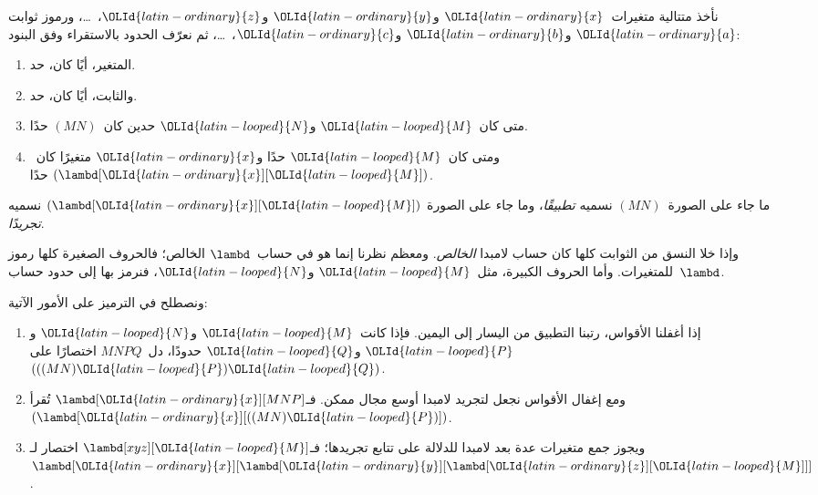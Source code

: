 \documentclass[../../../include/open-logic-section]{subfiles}
\begin{document}

نأخذ متتالية متغيرات~${\OLId{latin-ordinary}{x}}$ و${\OLId{latin-ordinary}{y}}$ و${\OLId{latin-ordinary}{z}}$،~\dots، ورموز ثوابت
${\OLId{latin-ordinary}{a}}$ و${\OLId{latin-ordinary}{b}}$ و${\OLId{latin-ordinary}{c}}$،~\dots، ثم نعرّف الحدود بالاستقراء وفق البنود:
\begin{enumerate}
\item المتغير، أيًا كان، حد.
\item والثابت، أيًا كان، حد.
\item متى كان~${\OLId{latin-looped}{M}}$ و${\OLId{latin-looped}{N}}$ حدين كان~$(MN)$ حدًا.
\item ومتى كان~${\OLId{latin-looped}{M}}$ حدًا و${\OLId{latin-ordinary}{x}}$ متغيرًا كان~$(\lambd[{\OLId{latin-ordinary}{x}}][{\OLId{latin-looped}{M}}])$ حدًا.
\end{enumerate}
ما جاء على الصورة~$(MN)$ نسميه \emph{تطبيقًا}، وما جاء على الصورة
$(\lambd[{\OLId{latin-ordinary}{x}}][{\OLId{latin-looped}{M}}])$ نسميه \emph{تجريدًا}.

وإذا خلا النسق من الثوابت كلها كان حساب لامبدا \emph{الخالص}.
ومعظم نظرنا إنما هو في حساب~$\lambd$ الخالص؛ فالحروف الصغيرة
كلها رموز للمتغيرات. وأما الحروف الكبيرة، مثل~${\OLId{latin-looped}{M}}$ و${\OLId{latin-looped}{N}}$،
فنرمز بها إلى حدود حساب~$\lambd$.

ونصطلح في الترميز على الأمور الآتية:

\begin{conv}
\begin{enumerate}
\item إذا أغفلنا الأقواس، رتبنا التطبيق من اليسار إلى اليمين.
  فإذا كانت~${\OLId{latin-looped}{M}}$ و${\OLId{latin-looped}{N}}$ و${\OLId{latin-looped}{P}}$ و${\OLId{latin-looped}{Q}}$ حدودًا، دل~$MNPQ$ اختصارًا
  على~$(((MN){\OLId{latin-looped}{P}}){\OLId{latin-looped}{Q}})$.
\item ومع إغفال الأقواس نجعل لتجريد لامبدا أوسع مجال ممكن.
  فـ$\lambd[{\OLId{latin-ordinary}{x}}][MNP]$ تُقرأ~$(\lambd[{\OLId{latin-ordinary}{x}}][((MN){\OLId{latin-looped}{P}})])$.
\item ويجوز جمع متغيرات عدة بعد لامبدا للدلالة على تتابع تجريدها؛
  فـ$\lambd[xyz][{\OLId{latin-looped}{M}}]$ اختصار
  لـ$\lambd[{\OLId{latin-ordinary}{x}}][\lambd[{\OLId{latin-ordinary}{y}}][\lambd[{\OLId{latin-ordinary}{z}}][{\OLId{latin-looped}{M}}]]]$.
\end{enumerate}
\end{conv}
\end{document}
